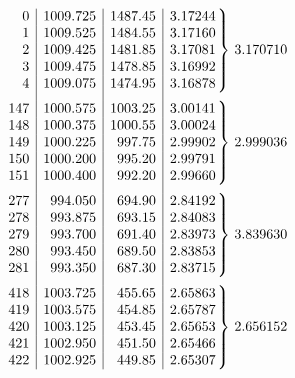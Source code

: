 \begin{center}
\fontsize{9}{11}\selectfont
$\begin{array}{r|r|r|r@{}l}
0&1009.725&1487.45&3.17244&\\
1&1009.525&1484.55&3.17160&\\
2&1009.425&1481.85&3.17081&\smash{\left.\vphantom{\begin{array}{c}0\\0\\0\\0\\0\end{array}}\right\}\,3.170710}\\
3&1009.475&1478.85&3.16992&\\
4&1009.075&1474.95&3.16878&\\[6pt]
147&1000.575&1003.25&3.00141&\\
148&1000.375&1000.55&3.00024&\\
149&1000.225&997.75&2.99902&\smash{\left.\vphantom{\begin{array}{c}0\\0\\0\\0\\0\end{array}}\right\}\,2.999036}\\
150&1000.200&995.20&2.99791&\\
151&1000.400&992.20&2.99660&\\[6pt]
277&994.050&694.90&2.84192&\\
278&993.875&693.15&2.84083&\\
279&993.700&691.40&2.83973&\smash{\left.\vphantom{\begin{array}{c}0\\0\\0\\0\\0\end{array}}\right\}\,3.839630}\\
280&993.450&689.50&2.83853&\\
281&993.350&687.30&2.83715&\\[6pt]
418&1003.725&455.65&2.65863&\\
419&1003.575&454.85&2.65787&\\
420&1003.125&453.45&2.65653&\smash{\left.\vphantom{\begin{array}{c}0\\0\\0\\0\\0\end{array}}\right\}\,2.656152}\\
421&1002.950&451.50&2.65466&\\
422&1002.925&449.85&2.65307&
\end{array}$
\end{center}

